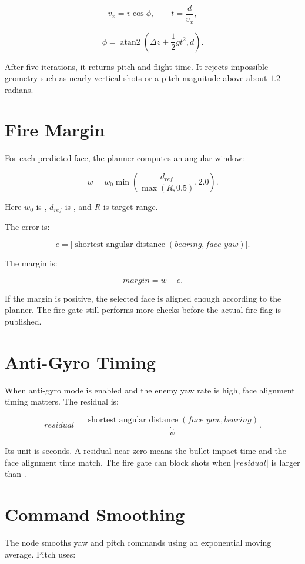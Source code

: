 \[
v_x = v\cos\phi,
\qquad
t = \frac{d}{v_x},
\]

\[
\phi = \operatorname{atan2}\left(\Delta z + \frac{1}{2}gt^2, d\right).
\]

After five iterations, it returns pitch and flight time. It rejects impossible
geometry such as nearly vertical shots or a pitch magnitude above about
$1.2$ radians.

\section{Fire Margin}

For each predicted face, the planner computes an angular window:

\[
w = w_0 \min\left(\frac{d_{ref}}{\max(R,0.5)},2.0\right).
\]

Here $w_0$ is , $d_{ref}$ is
, and $R$ is target range.

The error is:

\[
e = |\operatorname{shortest\_angular\_distance}(bearing, face\_yaw)|.
\]

The margin is:

\[
margin = w - e.
\]

If the margin is positive, the selected face is aligned enough according to
the planner. The fire gate still performs more checks before the actual fire
flag is published.

\section{Anti-Gyro Timing}

When anti-gyro mode is enabled and the enemy yaw rate is high, face alignment
timing matters. The residual is:

\[
residual = \frac{
\operatorname{shortest\_angular\_distance}(face\_yaw,bearing)
}{\dot{\psi}}.
\]

Its unit is seconds. A residual near zero means the bullet impact time and the
face alignment time match. The fire gate can block shots when
$|residual|$ is larger than .

\section{Command Smoothing}

The node smooths yaw and pitch commands using an exponential moving average.
Pitch uses:

